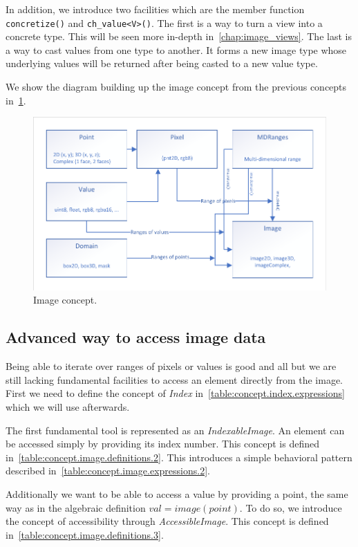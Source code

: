 In addition, we introduce two facilities which are the member function \texttt{concretize()} and
\texttt{ch\_value<V>()}. The first is a way to turn a view into a concrete type. This will be seen more in-depth
in~\cref{chap:image_views}. The last is a way to cast values from one type to another. It forms a new image type whose
underlying values will be returned after being casted to a new value type.

We show the diagram building up the image concept from the previous concepts in~\cref{fig:concept.image}.

\begin{figure}[tbh]
  \centering
  \includegraphics[width=.8\linewidth]{figs/concepts/image.pdf}
  \caption{Image concept.}
  \label{fig:concept.image}
\end{figure}


\subsection{Advanced way to access image data}
\label{subsec:advanced}

Being able to iterate over ranges of pixels or values is good and all but we are still lacking fundamental facilities to
access an element directly from the image. First we need to define the concept of \emph{Index}
in~\cref{table:concept.index.expressions} which we will use afterwards.

The first fundamental tool is represented as an \emph{IndexableImage}. An element can be accessed simply by providing
its index number. This concept is defined in~\cref{table:concept.image.definitions.2}. This introduces a simple
behavioral pattern described in~\cref{table:concept.image.expressions.2}.

Additionally we want to be able to access a value by providing a point, the same way as in the algebraic definition $val
  = image(point)$. To do so, we introduce the concept of accessibility through \emph{AccessibleImage}. This concept is
defined in~\cref{table:concept.image.definitions.3}.

